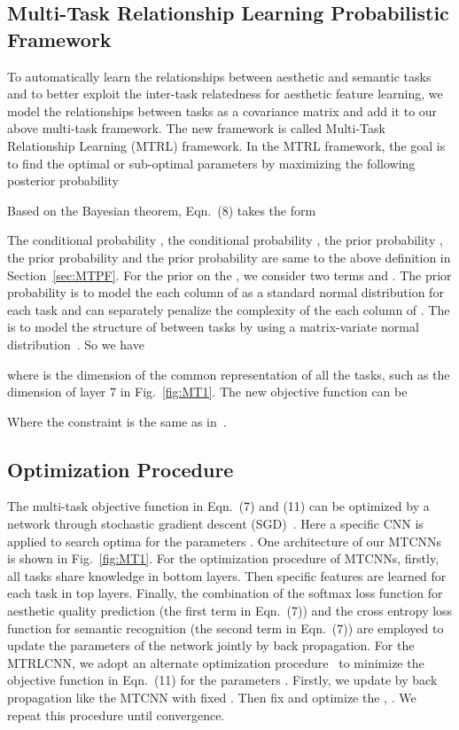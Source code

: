 \documentclass[journal]{IEEEtran}
\begin{document}
\subsection{Multi-Task Relationship Learning Probabilistic Framework \label{sec:MTRLPF}}
To automatically learn the relationships between aesthetic and semantic tasks and to better exploit the inter-task relatedness for aesthetic feature learning, we model the relationships between tasks as a covariance matrix  and add it to our above multi-task framework. The new framework is called Multi-Task Relationship Learning (MTRL) framework. In the MTRL framework, the goal is to find the optimal or sub-optimal parameters  by maximizing the following posterior probability

Based on the Bayesian theorem, Eqn.~(8) takes the form

The conditional probability , the conditional probability , the prior probability , the prior probability  and the prior probability  are same to the above definition in Section~\ref{sec:MTPF}. For the prior on the , we consider two terms  and . The prior probability  is to model the each column of  as a standard normal distribution for each task and can separately penalize the complexity of the each column of . The  is to model the structure of  between tasks by using a matrix-variate normal distribution~\cite{zhang2010convex,gupta1999matrix}. So we have

where  is the dimension of the common representation of all the tasks, such as the dimension of layer 7 in Fig.~\ref{fig:MT1}. The new objective function can be

Where the constraint  is the same as in~\cite{zhang2010convex}.

\subsection{Optimization Procedure \label{sec:op}}
The multi-task objective function in Eqn.~(7) and (11) can be optimized by a network through stochastic gradient descent (SGD)~\cite{Krizhevsky12}. Here a specific CNN is applied to search optima for the parameters . One architecture of our MTCNNs is shown in Fig.~\ref{fig:MT1}. For the optimization procedure of MTCNNs, firstly, all tasks share knowledge in bottom layers. Then specific features are learned for each task in top layers. Finally, the combination of the softmax loss function for aesthetic quality prediction (the first term in Eqn.~(7)) and the cross entropy loss function for semantic recognition (the second term in Eqn.~(7)) are employed to update the parameters of the network jointly by back propagation. For the MTRLCNN, we adopt an alternate optimization procedure~\cite{zhang2010convex} to minimize the objective function in Eqn.~(11) for the parameters . Firstly, we update  by back propagation like the MTCNN with fixed . Then fix  and optimize the , . We repeat this procedure until convergence.
\end{document}

